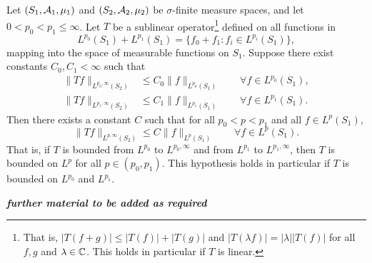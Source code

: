 \begin{thm}[Marcinkiewicz]\label{thm:marcinkiewicz}
  Let $(S_1,\mathcal{A}_1,\mu_1)$ and $(S_2,\mathcal{A}_2,\mu_2)$ be $\sigma$-finite measure spaces, and let $0 < p_0 < p_1 \leq \infty$.
  Let $T$ be a sublinear operator\footnote{That is, $|T(f + g)| \leq |T(f)| + |T(g)|$ and $|T(\lambda f)| = |\lambda||T(f)|$ for all $f,g$ and $\lambda \in \mathbb{C}$. This holds in particular if $T$ is linear.} defined on all functions in
  \begin{equation*}
    L^{p_0}(S_1) + L^{p_1}(S_1) = \{f_0 + f_1 : f_i \in L^{p_i}(S_1)\},
  \end{equation*}
  mapping into the space of measurable functions on $S_1$.
  Suppose there exist constants $C_0, C_1 < \infty$ such that
  \begin{equation*}
    \begin{aligned}
      \|Tf\|_{L^{p_0,\infty}(S_2)} &\leq C_0 \|f\|_{L^{p_0}(S_1)} \qquad \forall f \in L^{p_0}(S_1), \\
      \|Tf\|_{L^{p_1,\infty}(S_2)} &\leq C_1 \|f\|_{L^{p_1}(S_1)} \qquad \forall f \in L^{p_1}(S_1).
    \end{aligned}
  \end{equation*}
  Then there exists a constant $C$ such that for all $p_0 < p < p_1$ and all $f \in L^p(S_1)$,
  \begin{equation*}
    \|Tf\|_{L^{p,\infty}(S_2)} \leq C \|f\|_{L^{p}(S_1)} \qquad \forall f \in L^{p}(S_1).
  \end{equation*}
  That is, if $T$ is bounded from $L^{p_0}$ to $L^{p_0,\infty}$ and from $L^{p_1}$ to $L^{p_1,\infty}$, then $T$ is bounded on $L^p$ for all $p \in (p_0,p_1)$.
  This hypothesis holds in particular if $T$ is bounded on $L^{p_0}$ and $L^{p_1}$.
\end{thm}




\emph{\textbf{further material to be added as required}}







